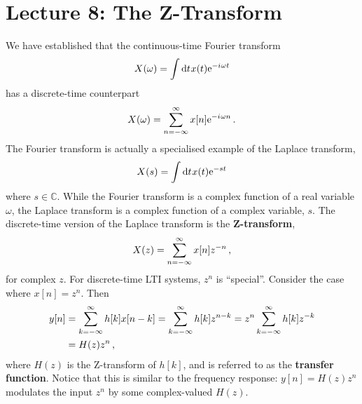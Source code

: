 \section{Lecture 8: The Z-Transform}

We have established that the continuous-time Fourier transform
%
\begin{displaymath}
  X(\omega) = \int\mathrm{d}t\mkern1mux(t)\mathrm{e}^{-{i\mkern1mu}\omega t}
\end{displaymath}
%
has a discrete-time counterpart
%
\begin{displaymath}
  X(\omega) = \sum_{n=-\infty}^\infty x[n]\mathrm{e}^{-{i\mkern1mu}\omega n} \,.
\end{displaymath}
%
The Fourier transform is actually a specialised example of
the Laplace transform,
%
\begin{equation}
  X(s) = \int\mathrm{d}t\mkern1mux(t)\mathrm{e}^{-st}
\end{equation}
%
where $s\in\mathbb{C}$. While the Fourier transform is a complex
function of a real variable $\omega$, the Laplace transform is a
complex function of a complex variable, $s$. The discrete-time
version of the Laplace transform is the \textbf{Z-transform},
%
\begin{equation}
  X(z) = \sum_{n=-\infty}^\infty x[n]z^{-n} \,,
\end{equation}
%
for complex $z$. For discrete-time LTI systems, $z^n$ is ``special''.
Consider the case where $x[n] = z^n$. Then
%
\begin{align*}
  y[n] &= \sum_{k=-\infty}^\infty h[k]x[n-k] = \sum_{k=-\infty}^\infty h[k]z^{n-k} = z^n\sum_{k=-\infty}^\infty h[k]z^{-k} \\
  &= H(z)z^n \,,
\end{align*}
%
where $H(z)$ is the Z-transform of $h[k]$, and is referred to as the
\textbf{transfer function}. Notice that this is similar to the
frequency response: $y[n] = H(z)z^n$ modulates the input $z^n$ by some
complex-valued $H(z)$.

